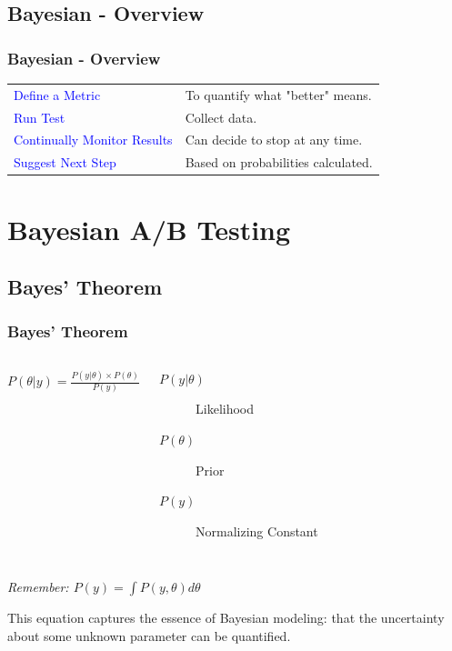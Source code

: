 \documentclass{beamer}
\begin{document}
\subsection{Bayesian - Overview}
\begin{frame}
  \frametitle{Bayesian - Overview}
  \begin{tabulary}{\textwidth}{LL}
    \textcolor{blue}{Define a Metric} & To quantify what "better" means. \\ [2mm]
    \textcolor{blue}{Run Test} & Collect data. \\ [2mm]
    \textcolor{blue}{Continually Monitor Results} & Can decide to stop at any time. \\ [7mm]
    \textcolor{blue}{Suggest Next Step} & Based on probabilities calculated. \\ [2mm]
  \end{tabulary}
\end{frame}

\section{Bayesian A/B Testing}
\subsection{Bayes' Theorem}
\begin{frame}
  \frametitle{Bayes' Theorem}
  \begin{columns}
    \begin{block}{}
      \centering
      {\LARGE \textbf{$ P(\theta | y) = \frac{P(y | \theta) \times P(\theta)}{P(y)} $}}
    \end{block}
    \begin{description}
      \item[$ P(y | \theta) $] Likelihood
      \item[$ P(\theta) $] Prior
      \item[$ P(y) $] Normalizing Constant
    \end{description}
  \end{columns}
  \vspace{2mm}

  \begin{center}
    \textit{Remember: $ P(y) = \int P(y, \theta) d\theta $}
  \end{center}
  \vspace{4mm}
  \pause

  This equation captures the essence of Bayesian modeling: that the uncertainty about some unknown parameter can be quantified.
\end{frame}
\end{document}
